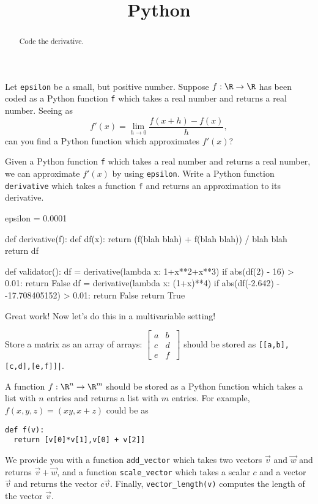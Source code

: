 \documentclass{ximera}
\title{Python}
\begin{document}
\begin{abstract}
  Code the derivative.	
\end{abstract}

\begin{exercise}
  Let \texttt{epsilon} be a small, but positive number.  Suppose $f:\R
  \to \R$ has been coded as a Python function \texttt{f} which takes a
  real number and returns a real number.  Seeing as
  $$
  f'(x) = \lim_{h \to 0} \frac{f(x+h) - f(x)}{h},
  $$
  can you find a Python function which approximates $f'(x)$?

  Given a Python function \texttt{f} which takes a real number and
  returns a real number, we can approximate $f'(x)$ by using
  \texttt{epsilon}.  Write a Python function \texttt{derivative} which
  takes a function \texttt{f} and returns an approximation to its
  derivative.

\begin{solution}
\begin{python}
epsilon = 0.0001


def derivative(f):
  def df(x): return (f(blah blah) + f(blah blah)) / blah blah
  return df


def validator():
  df = derivative(lambda x: 1+x**2+x**3)
  if abs(df(2) - 16) > 0.01:
    return False
  df = derivative(lambda x: (1+x)**4)
  if abs(df(-2.642) - -17.708405152) > 0.01:
    return False
  return True
\end{python}
\end{solution}

  Great work!  Now let's do this in a multivariable setting!

  Store a matrix as an array of arrays: $\begin{bmatrix} a&b\\c&d\\e&f\ \end{bmatrix}$ should be stored as
  \texttt{[[a,b],[c,d],[e,f]]|}.

  A function $f:\R^n \to \R^m$ should be stored as a Python function
  which takes a list with $n$ entries and returns a list with $m$
  entries.  For example, $f(x,y,z) = (xy,x+z)$ could be as
\begin{verbatim}
def f(v):
  return [v[0]*v[1],v[0] + v[2]]
\end{verbatim}
	
  We provide you with a function \texttt{add\_vector} which takes two
  vectors $\vec{v}$ and $\vec{w}$ and returns $\vec{v}+\vec{w}$, and a
  function \texttt{scale\_vector} which takes a scalar $c$ and a
  vector $\vec{v}$ and returns the vector $c\vec{v}$.  Finally,
  \texttt{vector\_length(v)} computes the length of the vector
  $\vec{v}$.


\end{exercise}
\end{document}

